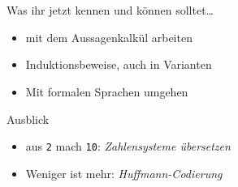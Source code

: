 \section{}
	\begin{frame}{Was ihr jetzt kennen und können solltet\dots}
			\begin{itemize}
				\item mit dem Aussagenkalkül arbeiten
				\item Induktionsbeweise, auch in Varianten
				\item Mit formalen Sprachen umgehen
			\end{itemize}
	
	\end{frame}
	\begin{frame}{Ausblick}
		\begin{itemize}
			\item aus \texttt{2} mach \texttt{10}: \emph{Zahlensysteme übersetzen} 
			\item Weniger ist mehr: \emph{Huffmann-Codierung}
		\end{itemize}
	\end{frame}
\section{}
\questionframe
\lastframe
{}
